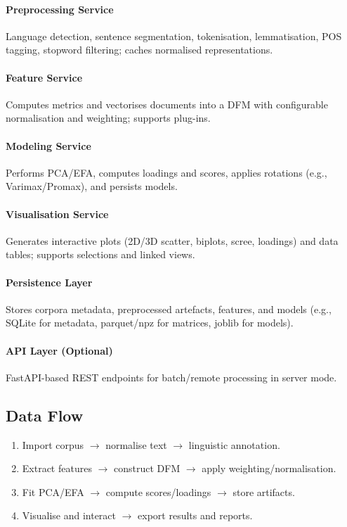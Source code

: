 \paragraph{Preprocessing Service}
Language detection, sentence segmentation, tokenisation, lemmatisation, POS tagging, stopword filtering; caches normalised representations.

\paragraph{Feature Service}
Computes metrics and vectorises documents into a DFM with configurable normalisation and weighting; supports plug-ins.

\paragraph{Modeling Service}
Performs PCA/EFA, computes loadings and scores, applies rotations (e.g., Varimax/Promax), and persists models.

\paragraph{Visualisation Service}
Generates interactive plots (2D/3D scatter, biplots, scree, loadings) and data tables; supports selections and linked views.

\paragraph{Persistence Layer}
Stores corpora metadata, preprocessed artefacts, features, and models (e.g., SQLite for metadata, parquet/npz for matrices, joblib for models).

\paragraph{API Layer (Optional)}
FastAPI-based REST endpoints for batch/remote processing in server mode.

\subsection{Data Flow}
\begin{enumerate}
    \item Import corpus $\rightarrow$ normalise text $\rightarrow$ linguistic annotation.
    \item Extract features $\rightarrow$ construct DFM $\rightarrow$ apply weighting/normalisation.
    \item Fit PCA/EFA $\rightarrow$ compute scores/loadings $\rightarrow$ store artifacts.
    \item Visualise and interact $\rightarrow$ export results and reports.
\end{enumerate}

